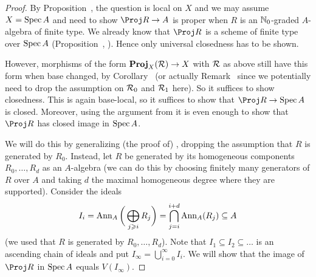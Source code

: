 \documentclass[a4paper,parskip=half,numbers=enddot, DIV=12]{scrreprt}
\renewcommand{\geq}{\geqslant}
\begin{document}
\begin{proof}
	By Proposition~, the question is local on $X$ and we may assume $X=\operatorname{Spec} A$ and need to show $\Proj R\morphism A$ is proper when $R$ is an $\mathbb{N}_0$-graded $A$-algebra of finite type. We already know that $\Proj R$ is a scheme of finite type over $\operatorname{Spec} A$ (Proposition~, ). Hence only universal closedness has to be shown.
	
	However, morphisms of the form $\PROJ_X(\Rr)\morphism X$ with $\mathcal{R}$ as above still have this form when base changed, by Corollary~ (or actually Remark~ since we potentially need to drop the assumption on $\mathcal{R}_0$ and $\mathcal{R}_1$ here). So it suffices to show closedness. This is again base-local, so it suffices to show that $\Proj R\morphism\Spec A$ is closed. Moreover, using the argument from \cite[Corollary~2.6.1]{alggeo1} it is even enough to show that $\Proj R$ has closed image in $\operatorname{Spec} A$.
	
	We will do this by generalizing (the proof of) \cite[Proposition~2.6.1]{alggeo1}, dropping the assumption that $R$ is generated by $R_0$. Instead, let $R$ be generated by its homogeneous components $R_0,\ldots,R_d$ as an $A$-algebra (we can do this by choosing finitely many generators of $R$ over $A$ and taking $d$ the maximal homogeneous degree where they are supported). Consider the ideals
	\begin{align}\lbl{eq:AnnullatorIdeal}
		I_i=\Ann_A\bigg(\bigoplus_{j\geq i}R_j\bigg)=\bigcap_{j=i}^{i+d}\Ann_A(R_j)\subseteq A
	\end{align}
	(we used that $R$ is generated by $R_0,\ldots,R_d$). Note that $I_1\subseteq I_2\subseteq \ldots$ is an ascending chain of ideals and put $I_\infty=\bigcup_{i=0}^\infty I_i$. We will show that the image of $\Proj R$ in $\operatorname{Spec} A$ equals $V(I_\infty)$.
	

\end{proof}
\end{document}
